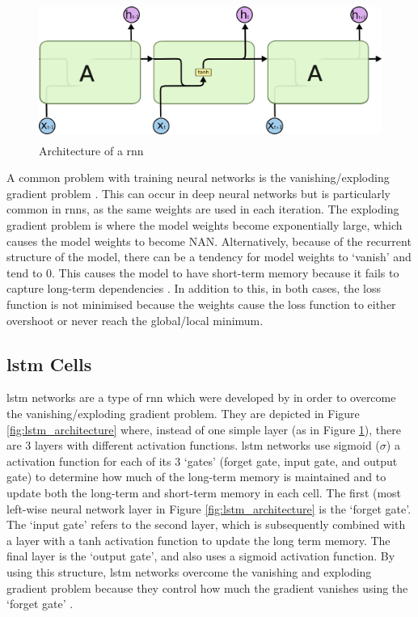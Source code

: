 \begin{figure}[h]
    \centering
    \includegraphics[height=4.5cm,trim={0 0 0cm 0cm},clip]{paper/images/rnn.png}
    \caption{Architecture of a \acrlong{rnn} \citep{olah2015understanding}}
    \label{fig:rnn_architecture}
\end{figure}

A common problem with training neural networks is the vanishing/exploding gradient problem \citep{hochreiter1997long}. This can occur in deep neural networks but is particularly common in \acrshort{rnn}s, as the same weights are used in each iteration. The exploding gradient problem is where the model weights become exponentially large, which causes the model weights to become NAN. Alternatively, because of the recurrent structure of the model, there can be a tendency for model weights to `vanish' and tend to 0. This causes the model to have short-term memory because it fails to capture long-term dependencies \citep{chung2014empirical}. In addition to this, in both cases, the loss function is not minimised because the weights cause the loss function to either overshoot or never reach the global/local minimum.

\subsection{\acrlong{lstm} Cells}
\label{sec:background_lstms}

\acrshort{lstm} networks are a type of \acrlong{rnn} which were developed by \citet{hochreiter1997long} in order to overcome the vanishing/exploding gradient problem. They are depicted in Figure \ref{fig:lstm_architecture} where, instead of one simple layer (as in Figure \ref{fig:rnn_architecture}), there are 3 layers with different activation functions. \acrshort{lstm} networks use sigmoid ($\sigma$) a activation function for each of its 3 `gates' (forget gate, input gate, and output gate) to determine how much of the long-term memory is maintained and to update both the long-term and short-term memory in each cell. The first (most left-wise neural network layer in Figure \ref{fig:lstm_architecture} is the `forget gate'. The `input gate' refers to the second layer, which is subsequently combined with a layer with a tanh activation function to update the long term memory. The final layer is the `output gate', and also uses a sigmoid activation function. By using this structure, \acrshort{lstm} networks overcome the vanishing and exploding gradient problem because they control how much the gradient vanishes using the `forget gate' \citep{Gers}.

